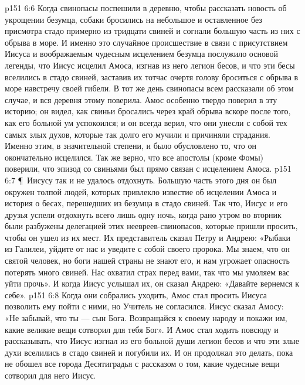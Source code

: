 \vs p151 6:6 Когда свинопасы поспешили в деревню, чтобы рассказать новость об укрощении безумца, собаки бросились на небольшое и оставленное без присмотра стадо примерно из тридцати свиней и согнали большую часть из них с обрыва в море. И именно это случайное происшествие в связи с присутствием Иисуса и воображаемым чудесным исцелением безумца послужило основой легенды, что Иисус исцелил Амоса, изгнав из него легион бесов, и что эти бесы вселились в стадо свиней, заставив их тотчас очертя голову броситься с обрыва в море навстречу своей гибели. В тот же день свинопасы всем рассказали об этом случае, и вся деревня этому поверила. Амос особенно твердо поверил в эту историю; он видел, как свиньи бросались через край обрыва вскоре после того, как его больной ум успокоился; и он всегда верил, что они унесли с собой тех самых злых духов, которые так долго его мучили и причиняли страдания. Именно этим, в значительной степени, и было обусловлено то, что он окончательно исцелился. Так же верно, что все апостолы (кроме Фомы) поверили, что эпизод со свиньями был прямо связан с исцелением Амоса.
\vs p151 6:7 \P\ Иисусу так и не удалось отдохнуть. Большую часть этого дня он был окружен толпой людей, которых привлекло известие об исцелении Амоса и история о бесах, перешедших из безумца в стадо свиней. Так что, Иисус и его друзья успели отдохнуть всего лишь одну ночь, когда рано утром во вторник были разбужены делегацией этих неевреев\hyp{}свинопасов, которые пришли просить, чтобы он ушел из их мест. Их представитель сказал Петру и Андрею: «Рыбаки из Галилеи, уйдите от нас и уведите с собой своего пророка. Мы знаем, что он святой человек, но боги нашей страны не знают его, и нам угрожает опасность потерять много свиней. Нас охватил страх перед вами, так что мы умоляем вас уйти прочь». И когда Иисус услышал их, он сказал Андрею: «Давайте вернемся к себе».
\vs p151 6:8 Когда они собрались уходить, Амос стал просить Иисуса позволить ему пойти с ними, но Учитель не согласился. Иисус сказал Амосу: «Не забывай, что ты --- сын Бога. Возвращайся к своему народу и покажи им, какие великие вещи сотворил для тебя Бог». И Амос стал ходить повсюду и рассказывать, что Иисус изгнал из его больной души легион бесов и что эти злые духи вселились в стадо свиней и погубили их. И он продолжал это делать, пока не обошел все города Десятиградья с рассказом о том, какие чудесные вещи сотворил для него Иисус.
